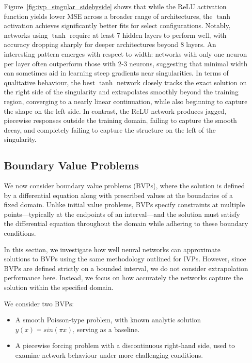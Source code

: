 Figure~\ref{fig:ivp_singular_sidebyside} shows that while the ReLU activation function yields 
lower MSE across a broader range of architectures, the \(\tanh\) activation achieves significantly
better fits for select configurations. Notably, networks using \(\tanh\) require at least 7 hidden 
layers to perform well, with accuracy dropping sharply for deeper architectures beyond 8 layers. 
An interesting pattern emerges with respect to width: networks with only one neuron per layer often 
outperform those with 2-3 neurons, suggesting that minimal width can sometimes aid in learning steep 
gradients near singularities. In terms of qualitative behaviour, the best \(\tanh\) network closely 
tracks the exact solution on the right side of the singularity and extrapolates smoothly beyond the 
training region, converging to a nearly linear continuation, while also beginning to capture the shape
on the left side. In contrast, the ReLU network produces jagged, piecewise responses outside the 
training domain, failing to capture the smooth decay, and completely failing 
to capture the structure on the left of the singularity.



\subsection{Boundary Value Problems}\label{sec:BVPs}


We now consider boundary value problems (BVPs), where the solution is defined by a 
differential equation along with prescribed values at the boundaries of a fixed domain. Unlike 
initial value problems, BVPs specify constraints at multiple points—typically at the endpoints of 
an interval—and the solution must satisfy the differential equation throughout the domain while 
adhering to these boundary conditions.

In this section, we investigate how well neural networks can approximate solutions to BVPs using 
the same methodology outlined for IVPs. However, since BVPs are defined strictly on a bounded 
interval, we do not consider extrapolation performance here. Instead, we focus on how accurately 
the networks capture the solution within the specified domain.

We consider two BVPs:
\begin{itemize}
    \item A smooth Poisson-type problem, with known analytic solution $y(x)=sin(\pi x)$, 
    serving as a baseline. 
    \item A piecewise forcing problem with a discontinuous right-hand side, used to examine network
     behaviour under more challenging conditions. 
\end{itemize}




